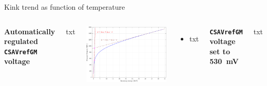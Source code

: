 \documentclass[aspectratio=169,xcolor=dvipsnames]{beamer}
\begin{document}
\begin{frame}{Kink trend as function of temperature}
\fontsize{8.5pt}{1}\selectfont
    \begin{columns}[T]
        \addtolength{\leftmargini}{\labelsep}
        \vskip0.3cm
        \textbf{Automatically regulated \texttt{CSAVrefGM} voltage}\\
        \vskip0.15cm
    
        txt

        \vskip-0.4cm
        \begin{center}
            \includegraphics[height=0.48\textheight]{images/temperature_effects/fdt_calcolo_kink.pdf}
        \end{center}

        \vskip-0.2cm
        \begin{itemize}
            \item txt
        \end{itemize}

            \addtolength{\leftmargini}{\labelsep}
            \vskip0.3cm
            \textbf{\texttt{CSAVrefGM} voltage set to \SI{530}{\milli\volt}}\\
            \vskip0.15cm
        
            txt
    

\end{columns}
\end{frame}
\end{document}

